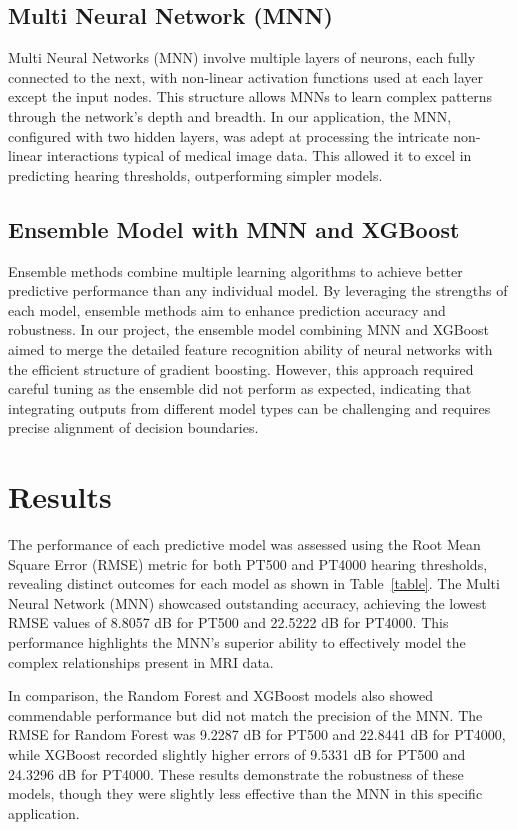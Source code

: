\documentclass[conference,compsoc]{IEEEtran}
\begin{document}
\subsection{Multi Neural Network (MNN)} Multi Neural Networks (MNN) involve multiple layers of neurons, each fully connected to the next, with non-linear activation functions used at each layer except the input nodes. This structure allows MNNs to learn complex patterns through the network's depth and breadth. In our application, the MNN, configured with two hidden layers, was adept at processing the intricate non-linear interactions typical of medical image data. This allowed it to excel in predicting hearing thresholds, outperforming simpler models.

\subsection{Ensemble Model with MNN and XGBoost} Ensemble methods combine multiple learning algorithms to achieve better predictive performance than any individual model. By leveraging the strengths of each model, ensemble methods aim to enhance prediction accuracy and robustness. In our project, the ensemble model combining MNN and XGBoost aimed to merge the detailed feature recognition ability of neural networks with the efficient structure of gradient boosting. However, this approach required careful tuning as the ensemble did not perform as expected, indicating that integrating outputs from different model types can be challenging and requires precise alignment of decision boundaries.



\section{Results}
The performance of each predictive model was assessed using the Root Mean Square Error (RMSE) metric for both PT500 and PT4000 hearing thresholds, revealing distinct outcomes for each model as shown in Table~\ref{table}. The Multi Neural Network (MNN) showcased outstanding accuracy, achieving the lowest RMSE values of 8.8057 dB for PT500 and 22.5222 dB for PT4000. This performance highlights the MNN's superior ability to effectively model the complex relationships present in MRI data.

\vspace{\baselineskip} %

In comparison, the Random Forest and XGBoost models also showed commendable performance but did not match the precision of the MNN. The RMSE for Random Forest was 9.2287 dB for PT500 and 22.8441 dB for PT4000, while XGBoost recorded slightly higher errors of 9.5331 dB for PT500 and 24.3296 dB for PT4000. These results demonstrate the robustness of these models, though they were slightly less effective than the MNN in this specific application.
\end{document}
